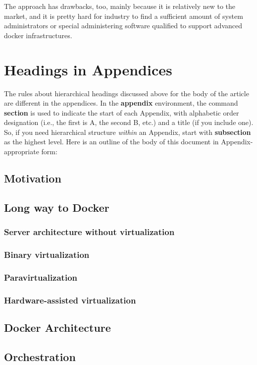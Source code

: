 The approach has drawbacks, too, mainly
because it is relatively new to the market,
and it is pretty hard for industry to find
a sufficient amount of system administrators or special
administering software qualified to support advanced docker infrastructures.



\appendix
\section{Headings in Appendices}
The rules about hierarchical headings discussed above for
the body of the article are different in the appendices.
In the \textbf{appendix} environment, the command
\textbf{section} is used to
indicate the start of each Appendix, with alphabetic order
designation (i.e., the first is A, the second B, etc.) and
a title (if you include one).  So, if you need
hierarchical structure
\textit{within} an Appendix, start with \textbf{subsection} as the
highest level. Here is an outline of the body of this
document in Appendix-appropriate form:
\subsection{Motivation}
\subsection{Long way to Docker}
\subsubsection{Server architecture without virtualization}
\subsubsection{Binary virtualization}
\subsubsection{Paravirtualization}
\subsubsection{Hardware-assisted virtualization}
\subsection{Docker Architecture}
\subsection{Orchestration}
